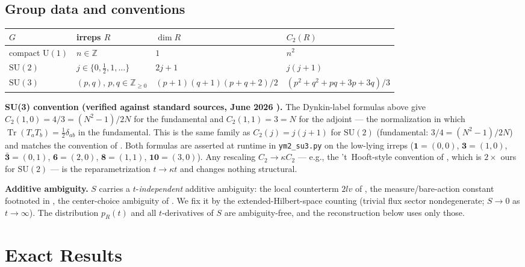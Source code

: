 \documentclass[11pt]{article}
\theoremstyle{remark}
\theoremstyle{plain}
\begin{document}
\subsection{Group data and conventions}\label{sec:groupdata}

\begin{center}
\begin{tabular}{llll}
\toprule
$G$ & irreps $R$ & $\dim R$ & $C_2(R)$ \\
\midrule
compact $\mathrm{U}(1)$ & $n \in \mathbb{Z}$ & $1$ & $n^2$ \\
$\mathrm{SU}(2)$ & $j \in \{0, \tfrac12, 1, \dots\}$ & $2j+1$ & $j(j+1)$ \\
$\mathrm{SU}(3)$ & $(p,q)$, $p,q \in \mathbb{Z}_{\geq 0}$ & $(p+1)(q+1)(p+q+2)/2$ & $(p^2+q^2+pq+3p+3q)/3$ \\
\bottomrule
\end{tabular}
\end{center}

\textbf{SU(3) convention (verified against standard sources, June 2026 \cite{su3data}).} The Dynkin-label formulas above give $C_2(1,0) = 4/3 = (N^2-1)/2N$ for the fundamental and $C_2(1,1) = 3 = N$ for the adjoint --- the normalization in which $\operatorname{Tr}(T_a T_b) = \tfrac12\delta_{ab}$ in the fundamental. This is the same family as $C_2(j) = j(j+1)$ for $\mathrm{SU}(2)$ (fundamental: $3/4 = (N^2-1)/2N$) and matches the convention of \cite{D14}. Both formulas are asserted at runtime in \texttt{ym2\_su3.py} on the low-lying irreps ($\mathbf{1} = (0,0)$, $\mathbf{3} = (1,0)$, $\bar{\mathbf{3}} = (0,1)$, $\mathbf{6} = (2,0)$, $\mathbf{8} = (1,1)$, $\mathbf{10} = (3,0)$). Any rescaling $C_2 \to \kappa C_2$ --- e.g., the 't~Hooft-style convention of \cite{GS14}, which is $2\times$ ours for $\mathrm{SU}(2)$ --- is the reparametrization $t \to \kappa t$ and changes nothing structural.

\textbf{Additive ambiguity.} $S$ carries a $t$-\emph{independent} additive ambiguity: the local counterterm $2lv$ of \cite{GS14}, the measure/bare-action constant footnoted in \cite{D14}, the center-choice ambiguity of \cite{CHR}. We fix it by the extended-Hilbert-space counting (trivial flux sector nondegenerate; $S \to 0$ as $t \to \infty$). The distribution $p_R(t)$ and all $t$-derivatives of $S$ are ambiguity-free, and the reconstruction below uses only those.

\section{Exact Results}\label{sec:exact}
\end{document}
